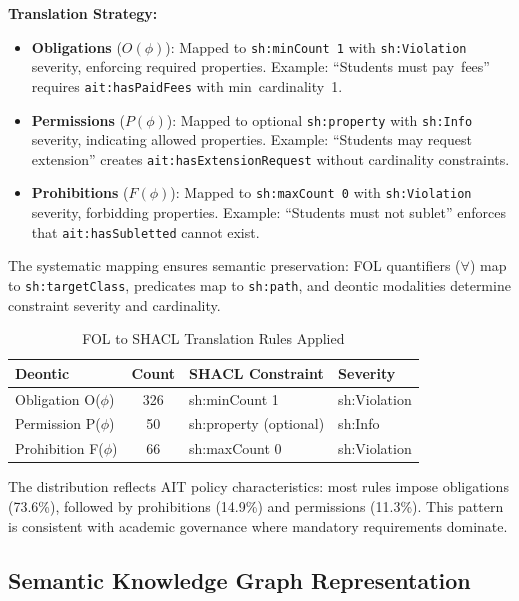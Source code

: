 \textbf{Translation Strategy:}

\begin{itemize}
    \item \textbf{Obligations} ($O(\phi)$): Mapped to \texttt{sh:minCount~1} with \texttt{sh:Violation} severity, enforcing required properties. Example: ``Students must pay~fees'' requires \texttt{ait:hasPaidFees} with min~cardinality~1.
    
    \item \textbf{Permissions} ($P(\phi)$): Mapped to optional \texttt{sh:property} with \texttt{sh:Info} severity, indicating allowed properties. Example: ``Students may request extension'' creates \texttt{ait:hasExtensionRequest} without cardinality constraints.
    
    \item \textbf{Prohibitions} ($F(\phi)$): Mapped to \texttt{sh:maxCount~0} with \texttt{sh:Violation} severity, forbidding properties. Example: ``Students must not sublet'' enforces that \texttt{ait:hasSubletted} cannot exist.
\end{itemize}

The systematic mapping ensures semantic preservation: FOL quantifiers ($\forall$) map to \texttt{sh:targetClass}, predicates map to \texttt{sh:path}, and deontic modalities determine constraint severity and cardinality.

\begin{table}[htbp]
\centering
\caption{FOL to SHACL Translation Rules Applied}
\label{tab:translation-rules}
\begin{tabular}{|l|c|l|l|}
\hline
\textbf{Deontic} & \textbf{Count} & \textbf{SHACL Constraint} & \textbf{Severity} \\
\hline
Obligation O($\phi$) & 326 & sh:minCount 1 & sh:Violation \\
Permission P($\phi$) & 50 & sh:property (optional) & sh:Info \\
Prohibition F($\phi$) & 66 & sh:maxCount 0 & sh:Violation \\
\hline
\end{tabular}
\end{table}

The distribution reflects AIT policy characteristics: most rules impose obligations (73.6\%), followed by prohibitions (14.9\%) and permissions (11.3\%). This pattern is consistent with academic governance where mandatory requirements dominate.

\subsection{Semantic Knowledge Graph Representation}

